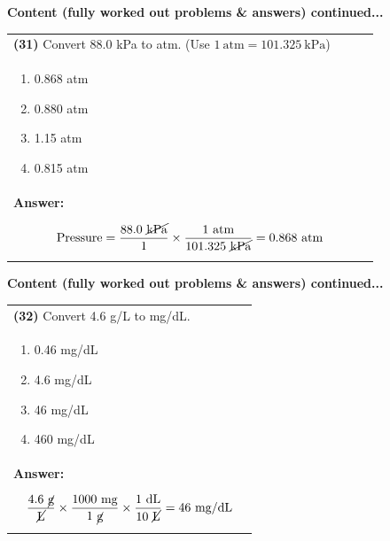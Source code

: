 \documentclass{article}
\begin{document}
\newpage
\noindent
{\large\textbf{Content (fully worked out problems \& answers) continued...}}\\[0.2em]
\vspace{0.2cm}
\begin{tabular}{|p{0.9\linewidth}|}
\hline
\vspace{0.2cm}
\textbf{(31)} Convert 88.0 kPa to atm. (Use $1~\text{atm}=101.325~\text{kPa}$)\\
\begin{minipage}[t]{0.85\linewidth}
\begin{enumerate}[label=\alph*.]
   \item 0.868 atm
   \item 0.880 atm
   \item 1.15 atm
   \item 0.815 atm
\end{enumerate}
\end{minipage}\\
\hline
\vspace{0.2cm}
\textbf{Answer:}\\
\[
\text{Pressure}=\frac{88.0~\cancel{\text{kPa}}}{1}\times\frac{1~\text{atm}}{101.325~\cancel{\text{kPa}}}=0.868~\text{atm}
\] \\
\hline
\end{tabular}

\newpage
\noindent
{\large\textbf{Content (fully worked out problems \& answers) continued...}}\\[0.2em]
\vspace{0.2cm}
\begin{tabular}{|p{0.9\linewidth}|}
\hline
\vspace{0.2cm}
\textbf{(32)} Convert 4.6 g/L to mg/dL.\\
\begin{minipage}[t]{0.85\linewidth}
\begin{enumerate}[label=\alph*.]
   \item 0.46 mg/dL
   \item 4.6 mg/dL
   \item 46 mg/dL
   \item 460 mg/dL
\end{enumerate}
\end{minipage}\\
\hline
\vspace{0.2cm}
\textbf{Answer:}\\
\[
\frac{4.6~\cancel{\text{g}}}{\cancel{\text{L}}}\times\frac{1000~\text{mg}}{1~\cancel{\text{g}}}\times\frac{1~\text{dL}}{10~\cancel{\text{L}}}=46~\text{mg/dL}
\] \\
\hline
\end{tabular}
\end{document}
